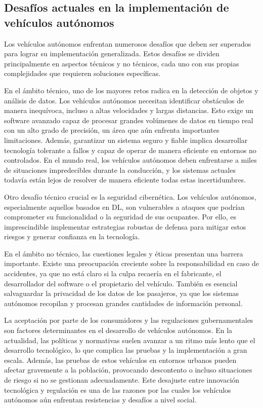 \subsection{Desafíos actuales en la implementación de vehículos autónomos}
\label{sec:desafíos}

Los vehículos autónomos enfrentan numerosos desafíos que deben ser superados para lograr su implementación generalizada. Estos desafíos se dividen principalmente en aspectos técnicos y no técnicos, cada uno con sus propias complejidades que requieren soluciones específicas.

En el ámbito técnico, uno de los mayores retos radica en la detección de objetos y análisis de datos. Los vehículos autónomos necesitan identificar obstáculos de manera inequívoca, incluso a altas velocidades y largas distancias. Esto exige un software avanzado capaz de procesar grandes volúmenes de datos en tiempo real con un alto grado de precisión, un área que aún enfrenta importantes limitaciones. Además, garantizar un sistema seguro y fiable implica desarrollar tecnología tolerante a fallos y capaz de operar de manera eficiente en entornos no controlados. En el mundo real, los vehículos autónomos deben enfrentarse a miles de situaciones impredecibles durante la conducción, y los sistemas actuales todavía están lejos de resolver de manera eficiente todas estas incertidumbres.

Otro desafío técnico crucial es la seguridad cibernética. Los vehículos autónomos, especialmente aquellos basados en \ac{DL}, son vulnerables a ataques que podrían comprometer su funcionalidad o la seguridad de sus ocupantes. Por ello, es imprescindible implementar estrategias robustas de defensa para mitigar estos riesgos y generar confianza en la tecnología.

En el ámbito no técnico, las cuestiones legales y éticas presentan una barrera importante. Existe una preocupación creciente sobre la responsabilidad en caso de accidentes, ya que no está claro si la culpa recaería en el fabricante, el desarrollador del software o el propietario del vehículo. También es esencial salvaguardar la privacidad de los datos de los pasajeros, ya que los sistemas autónomos recopilan y procesan grandes cantidades de información personal.

La aceptación por parte de los consumidores y las regulaciones gubernamentales son factores determinantes en el desarrollo de vehículos autónomos. En la actualidad, las políticas y normativas suelen avanzar a un ritmo más lento que el desarrollo tecnológico, lo que complica las pruebas y la implementación a gran escala. Además, las pruebas de estos vehículos en entornos urbanos pueden afectar gravemente a la población, provocando descontento o incluso situaciones de riesgo si no se gestionan adecuadamente. Este desajuste entre innovación tecnológica y regulación es una de las razones por las cuales los vehículos autónomos aún enfrentan resistencias y desafíos a nivel social.

